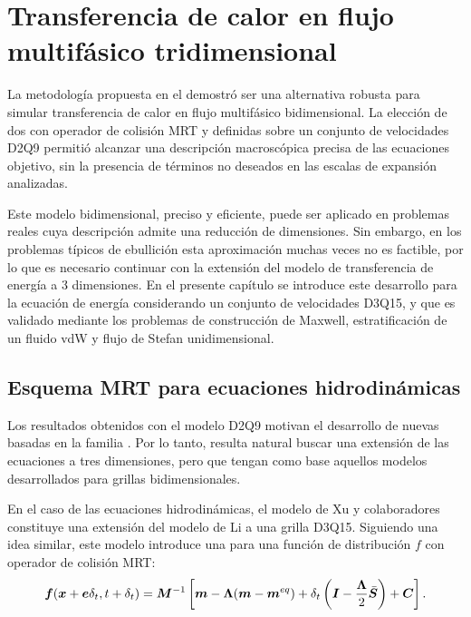 \chapter{Transferencia de calor en flujo multif\'asico tridimensional}
\label{chap:modelo3D}

La metodolog\'ia propuesta en el  demostr\'o ser una alternativa robusta para simular transferencia de calor en flujo multif\'asico bidimensional. La elecci\'on de dos \lbe{} con operador de colisi\'on MRT y definidas sobre un conjunto de velocidades D2Q9 permiti\'o alcanzar una descripci\'on macrosc\'opica precisa de las ecuaciones objetivo, sin la presencia de t\'erminos no deseados en las escalas de expansi\'on analizadas. 

Este modelo bidimensional, preciso y eficiente, puede ser aplicado en problemas reales cuya descripci\'on admite una reducci\'on de dimensiones. Sin embargo, en los problemas t\'ipicos de ebullici\'on esta aproximaci\'on muchas veces no es factible, por lo que es necesario continuar con la extensi\'on del modelo de transferencia de energ\'ia a 3 dimensiones. En el presente cap\'itulo se introduce este desarrollo para la ecuaci\'on de energ\'ia considerando un conjunto de velocidades D3Q15, y que es validado mediante los problemas de construcci\'on de Maxwell, estratificaci\'on de un fluido vdW y flujo de Stefan unidimensional.


\section{Esquema MRT para ecuaciones hidrodin\'amicas}

Los resultados obtenidos con el modelo D2Q9 motivan el desarrollo de nuevas \lbe{} basadas en la familia \pp{}. Por lo tanto, resulta natural buscar una extensi\'on de las ecuaciones a tres dimensiones, pero que tengan como base aquellos modelos desarrollados para grillas bidimensionales.

En el caso de las ecuaciones hidrodin\'amicas, el modelo de Xu y colaboradores \cite{xu_three-dimensional_2015} constituye una extensi\'on del modelo de Li \cite{li_lattice_2013} a una grilla D3Q15. Siguiendo una idea similar, este modelo introduce una \lbe{} para una funci\'on de distribuci\'on $f$ con operador de colisi\'on MRT:
\begin{equation}
	\bm{f} (\bm{x} + \bm{e}\delta_t, t+\delta_t) = \bm{M}^{-1}\left[ \bm{m} - \bm{\Lambda}(\bm{m} - \bm{m}^{eq})  + \delta_t \left( \bm{I} - \dfrac{\bm{\Lambda}}{2} \bar{\bm{S}} \right) + \bm{C}\right].
	\label{eq:lbe_xu}	
\end{equation}

